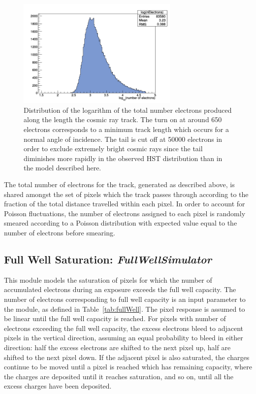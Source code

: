 \documentclass[11pt]{article}      %
\def\HCode#1{}
\def\htmlanchor#1{\HCode{<a id="#1"></a>}}
\begin{document}
\begin{figure}[hbtp]
  \begin{center}
    \includegraphics[width=0.7\textwidth]{cosmic_logNElectrons.png}
    \caption{Distribution of the logarithm of the total number electrons produced along the length the cosmic ray track.  The turn on at around 650 electrons corresponds to a minimum track length which occurs for a normal angle of incidence.  The tail is cut off at 50000 electrons in order to exclude extremely bright cosmic rays since the tail diminishes more rapidly in the observed HST distribution than in the model described here.}
    \label{fig:cosmic_nelectrons}
  \end{center}
\end{figure}

The total number of electrons for the track, generated as described above, is shared amongst the set of pixels which the track passes through according to the fraction of the total distance travelled within each pixel.  In order to account for Poisson fluctuations, the number of electrons assigned to each pixel is randomly smeared according to a Poisson distribution with expected value equal to the number of electrons before smearing.

\clearpage 
\htmlanchor{FullWellSimulator}
\subsection{Full Well Saturation:  {\it FullWellSimulator}}
\label{sec:FullWellSimulator}

This module models the saturation of pixels for which the number of accumulated electrons during an exposure exceeds the full well capacity. The number of electrons corresponding to full well capacity is an input parameter to the module, as defined in Table~\ref{tab:fullWell}. The pixel response is assumed to be linear until the full well capacity is reached. For pixels with number of electrons exceeding the full well capacity, the excess electrons bleed to adjacent pixels in the vertical direction, assuming an equal probability to bleed in either direction: half the excess electrons are shifted to the next pixel up, half are shifted to the next pixel down. If the adjacent pixel is also saturated, the charges continue to be moved until a pixel is reached which has remaining capacity, where the charges are deposited until it reaches saturation, and so on, until all the excess charges have been deposited.
\end{document}
